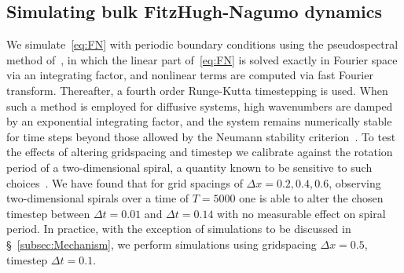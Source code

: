 \subsection{Simulating bulk FitzHugh-Nagumo dynamics}
\label{subsec:Simulation}
We simulate~\eqref{eq:FN} with periodic boundary conditions using the pseudospectral method of~\citep{Goldstein1996}, in which the linear part of~\eqref{eq:FN} is solved exactly in Fourier space via an integrating factor, and nonlinear terms are computed via fast Fourier transform. Thereafter, a fourth order Runge-Kutta timestepping is used. When such a method is employed for diffusive systems, high wavenumbers are damped by an exponential integrating factor, and the system remains numerically stable for time steps beyond those allowed by the Neumann stability criterion~\citep{Goldstein1996}. To test the effects of altering gridspacing and timestep we calibrate against the rotation period of a two-dimensional spiral, a quantity known to be sensitive to such choices~\citep{Dowle1997}. We have found that for grid spacings of $\Delta x = 0.2,0.4, 0.6$, observing two-dimensional spirals over a time of $T = 5000$ one is able to alter the chosen timestep between $\Delta t = 0.01$ and $\Delta t = 0.14$ with no measurable effect on spiral period. In practice, with the exception of simulations to be discussed in \S~\ref{subsec:Mechanism}, we perform simulations using gridspacing $\Delta x = 0.5$, timestep $\Delta t = 0.1$.

